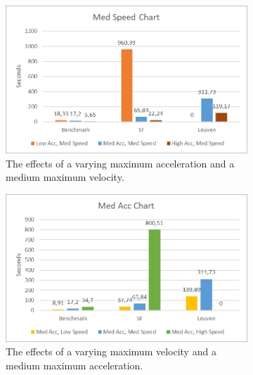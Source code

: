 \begin{figure}
	\centering
	
	\begin{subfigure}[t]{.9\textwidth}
        		\includegraphics[width=\textwidth]{img/agility-med-speed}
        		\caption{The effects of a varying maximum acceleration and a medium maximum velocity.}
        		\label{fig:agility-med-speed}
	\end{subfigure}
		
	\begin{subfigure}[t]{.9\textwidth}
        		\includegraphics[width=\textwidth]{img/agility-med-acc}
        		\caption{The effects of a varying maximum velocity and a medium maximum acceleration.}
        		\label{fig:agility-med-acc}
	\end{subfigure}	
	
        
    \caption{}\label{fig:agility-med}
\end{figure}


